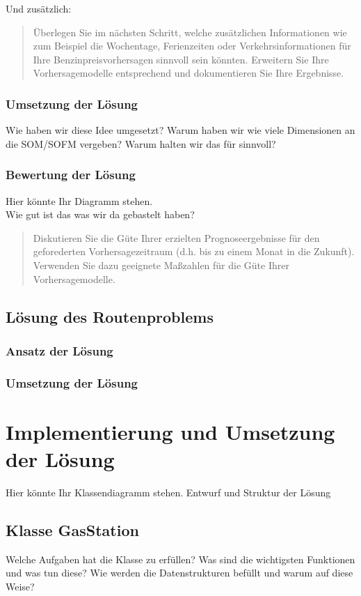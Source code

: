 \documentclass[11pt]{article}
\begin{document}
	Und zusätzlich:
	\begin{quote}
		Überlegen Sie im nächsten Schritt, welche zusätzlichen Informationen wie zum Beispiel die Wochentage, Ferienzeiten oder Verkehrsinformationen für Ihre Benzinpreisvorhersagen sinnvoll sein könnten. Erweitern Sie Ihre Vorhersagemodelle entsprechend und dokumentieren Sie Ihre Ergebnisse.
	\end{quote}
\subsubsection{Umsetzung der Lösung}
	Wie haben wir diese Idee umgesetzt? Warum haben wir wie viele Dimensionen an die SOM/SOFM vergeben? Warum halten wir das für sinnvoll?
\subsubsection{Bewertung der Lösung}
	Hier könnte Ihr Diagramm stehen. \\
	Wie gut ist das was wir da gebastelt haben?
	\begin{quote}
		Diskutieren Sie die Güte Ihrer erzielten Prognoseergebnisse für den geforederten Vorhersagezeitraum (d.h. bis zu einem Monat in die Zukunft). Verwenden Sie dazu geeignete Maßzahlen für die Güte Ihrer Vorhersagemodelle. 
	\end{quote}
\subsection{Lösung des Routenproblems}
\subsubsection{Ansatz der Lösung}
\subsubsection{Umsetzung der Lösung}
\section{Implementierung und Umsetzung der Lösung}
	Hier könnte Ihr Klassendiagramm stehen.	
	Entwurf und Struktur der Lösung
\subsection{Klasse GasStation}
	Welche Aufgaben hat die Klasse zu erfüllen? Was sind die wichtigsten Funktionen und was tun diese? Wie werden die Datenstrukturen befüllt und warum auf diese Weise?
\end{document}
